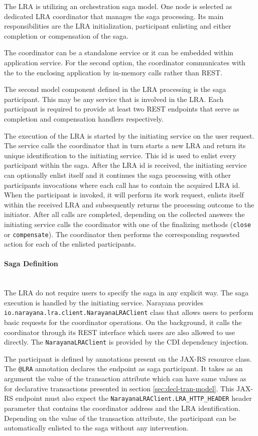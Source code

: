 \documentclass[oneside,
  digital, %
  table,   %
  nolof,     %
  nolot,     %
]{fithesis3}
\newcommand{\newlinepar}[1]{\paragraph{#1}\needspace{4\baselineskip}\mbox{}\\}
\begin{document}
The LRA is utilizing an orchestration saga model. One node is selected as dedicated LRA coordinator that manages the saga processing. Its main responsibilities are the LRA initialization, participant enlisting and either completion or compensation of the saga. 

The coordinator can be a standalone service or it can be embedded within application service. For the second option, the coordinator communicates with the to the enclosing application by in-memory calls rather than REST.

The second model component defined in the LRA processing is the saga participant. This may be any service that is involved in the LRA. Each participant is required to provide at least two REST endpoints that serve as completion and compensation handlers respectively.

The execution of the LRA is started by the initiating service on the user request. The service calls the coordinator that in turn starts a new LRA and return its  unique identification to the initiating service. This id is used to enlist every participant within the saga. After the LRA id is received, the initiating service can optionally enlist itself and it continues the saga processing with other participants invocations where each call has to contain the acquired LRA id. When the participant is invoked, it will perform its work request, enlists itself within the received LRA and subsequently returns the processing outcome to the initiator. After all calls are completed, depending on the collected answers the initiating service calls the coordinator with one of the finalizing methods (\texttt{close} or \texttt{compensate}). The coordinator then performs the corresponding requested action for each of the enlisted participants.
 
\newlinepar{Saga Definition}

The LRA do not require users to specify the saga in any explicit way. The saga execution is handled by the initiating service. Narayana provides \texttt{io.narayana.lra.client.NarayanaLRAClient} class that allows users to perform basic requests for the coordinator operations. On the background, it calls the coordinator through its REST interface which users are also allowed to use directly. The \texttt{NarayanaLRAClient} is provided by the CDI dependency injection.

The participant is defined by annotations present on the JAX-RS resource class. The \texttt{@LRA} annotation declares the endpoint as saga participant. It takes as an argument the value of the transaction attribute which can have same values as for declarative transactions presented in section \ref{sec:decl-tran-model}. This JAX-RS endpoint must also expect the \texttt{NarayanaLRAClient.LRA\_HTTP\_HEADER} header parameter that contains the coordinator address and the LRA identification. Depending on the value of the transaction attribute, the participant can be automatically enlisted to the saga without any intervention.
\end{document}
